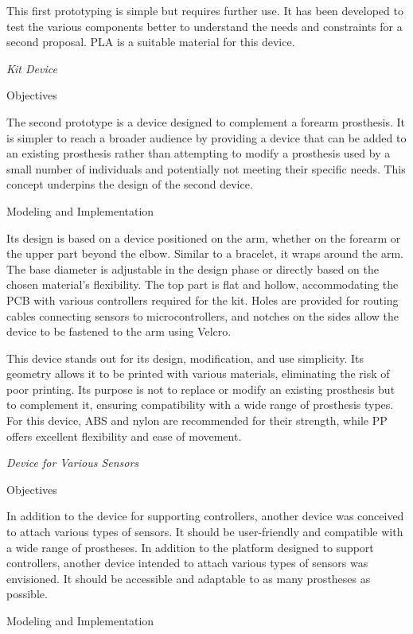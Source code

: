 This first prototyping is simple but requires further use. It has been developed to test the various components better to understand the needs and constraints for a second proposal. PLA is a suitable material for this device. 

\textit{Kit Device}
\item Objectives

The second prototype is a device designed to complement a forearm prosthesis. It is simpler to reach a broader audience by providing a device that can be added to an existing prosthesis rather than attempting to modify a prosthesis used by a small number of individuals and potentially not meeting their specific needs. This concept underpins the design of the second device.

\item Modeling and Implementation

Its design is based on a device positioned on the arm, whether on the forearm or the upper part beyond the elbow. Similar to a bracelet, it wraps around the arm. The base diameter is adjustable in the design phase or directly based on the chosen material's flexibility. The top part is flat and hollow, accommodating the PCB with various controllers required for the kit. Holes are provided for routing cables connecting sensors to microcontrollers, and notches on the sides allow the device to be fastened to the arm using Velcro.

This device stands out for its design, modification, and use simplicity. Its geometry allows it to be printed with various materials, eliminating the risk of poor printing. Its purpose is not to replace or modify an existing prosthesis but to complement it, ensuring compatibility with a wide range of prosthesis types. For this device, ABS and nylon are recommended for their strength, while PP offers excellent flexibility and ease of movement.

\textit{Device for Various Sensors}
\item Objectives

In addition to the device for supporting controllers, another device was conceived to attach various types of sensors. It should be user-friendly and compatible with a wide range of prostheses. In addition to the platform designed to support controllers, another device intended to attach various types of sensors was envisioned. It should be accessible and adaptable to as many prostheses as possible.

\item Modeling and Implementation

